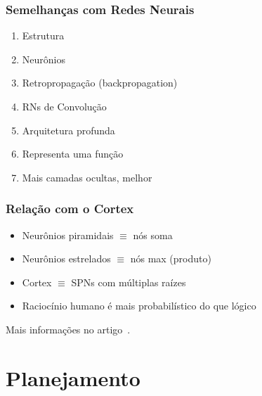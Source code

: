 \documentclass[10pt]{beamer}
\theoremstyle{plain}
\begin{document}
\begin{frame}
  \frametitle{Semelhanças com Redes Neurais}

  \begin{enumerate}
    \item Estrutura
    \item Neurônios
    \item Retropropagação (backpropagation)
    \item RNs de Convolução
    \item Arquitetura profunda
    \item Representa uma função
    \item Mais camadas ocultas, melhor~\cite{shallow-vs-deep}
  \end{enumerate}
\end{frame}

\begin{frame}
  \frametitle{Relação com o Cortex}

  \begin{itemize}
    \item Neurônios piramidais $\equiv$ nós soma
    \item Neurônios estrelados $\equiv$ nós max (produto)
    \item Cortex $\equiv$ SPNs com múltiplas raízes
    \item Raciocínio humano é mais probabilístico do que lógico
  \end{itemize}

  Mais informações no artigo~\cite{poon-domingos}.
\end{frame}


\section{Planejamento}
\end{document}
